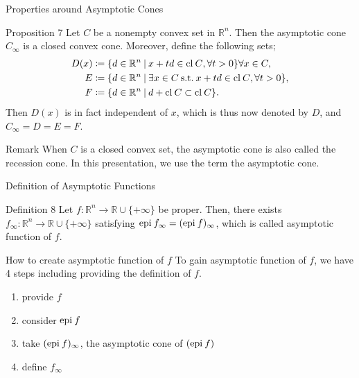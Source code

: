 \documentclass[aspectratio=169, dvipdfmx, 11pt]{beamer} %
\newcommand{\RealNumberSet}{\mathbb{R}}
\newcommand{\NDemenstionalRealEuclidianSpace}{\mathbb{R}^n}
\newcommand{\Closure}[1]{\text{\rm cl\:${#1}$}} %
\newcommand{\Epigraph}[1]{\text{\rm epi\:${#1}$}} %
\newcommand{\SuchThat}{\:\text{s.t.}\:}
\newcommand{\SetForm}[2]{
  \{{#1}\:|\:{#2}\}
}
\begin{document}
\begin{frame}{Properties around Asymptotic Cones}
  \begin{block}{Proposition 7}
    Let $C$ be a nonempty convex set in $\NDemenstionalRealEuclidianSpace$. Then the asymptotic cone $C_{\infty}$ is a closed convex cone. Moreover, define the following sets;
    \begin{align}
      D(x) &\coloneqq \SetForm{d \in \NDemenstionalRealEuclidianSpace}{x+td \in \Closure{C}, \forall t > 0} \forall x \in C, \notag \\
      E &\coloneqq \SetForm{d \in \NDemenstionalRealEuclidianSpace}{\exists x \in C \SuchThat x+td \in \Closure{C}, \forall t > 0}, \notag \\
      F &\coloneqq \SetForm{d \in \NDemenstionalRealEuclidianSpace}{d + \Closure{C} \subset \Closure{C}}. \notag
    \end{align}
    Then $D(x)$ is in fact independent of $x$, which is thus now denoted by $D$, and $C_{\infty} = D = E = F$.
  \end{block}

  \begin{alertblock}{Remark}
    When $C$ is a closed convex set, the asymptotic cone is also called the recession cone. In this presentation, we use the term the asymptotic cone.
  \end{alertblock}
\end{frame}

\begin{frame}{Definition of Asymptotic Functions}
  \begin{block}{Definition 8}
    Let $f: \NDemenstionalRealEuclidianSpace \rightarrow \RealNumberSet \cup \{+\infty\}$ be proper. Then, there exists $f_{\infty}: \NDemenstionalRealEuclidianSpace \rightarrow \RealNumberSet \cup \{+\infty\}$ satisfying $\Epigraph{f_{\infty}} = (\Epigraph{f})_{\infty}$, which is called asymptotic function of $f$.
  \end{block}

  \pause
  \begin{exampleblock}{How to create asymptotic function of $f$}
    To gain asymptotic function of $f$, we have 4 steps including providing the definition of $f$.
    \begin{enumerate}
      \item provide $f$
      \item consider $\Epigraph{f}$
      \item take $(\Epigraph{f})_{\infty}$, the asymptotic cone of $(\Epigraph{f})$
      \item define $f_{\infty}$
    \end{enumerate}
  \end{exampleblock}
\end{frame}
\end{document}
